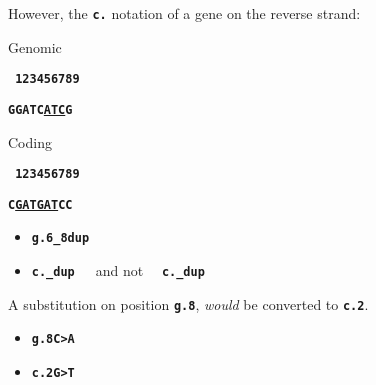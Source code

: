 \documentclass[a4, portrait]{seminar}
\newcommand{\bt}[1]{\texttt{\textbf{#1}}}
\begin{document}
\begin{slide}
  
  However, the \bt{c.} notation of a gene on the reverse strand:

  \begin{minipage}{0.4\textwidth}
    \begin{center}
      Genomic

      \bt{\,123456789}
      \vspace{-0.15cm}

      \bt{GGATC\green\underline{\white ATC}\white G}
    \end{center}
  \end{minipage}
  \begin{minipage}{0.4\textwidth}
    \begin{center}
      Coding

      \bt{\,123456789}
      \vspace{-0.15cm}

      \bt{C\green\underline{\white GAT}\yellow\underline{\white GAT}\white CC}
    \end{center}
  \end{minipage}
  \bigskip

  \begin{itemize}
    \item \bt{g.6\_8dup}
    \item \bt{c.\white \_\white dup}\white \ \ \ and not \ \ 
      \bt{c.\white \_\white dup}
  \end{itemize}

  A substitution on position \bt{g.8}, \emph{would} be converted to \bt{c.2}.

  \begin{itemize}
    \item \bt{g.8\yellow C\white >\yellow A\white}
    \item \bt{c.2\yellow G\white >\yellow T\white}
  \end{itemize}
  \vfill
\end{slide}
\end{document}
